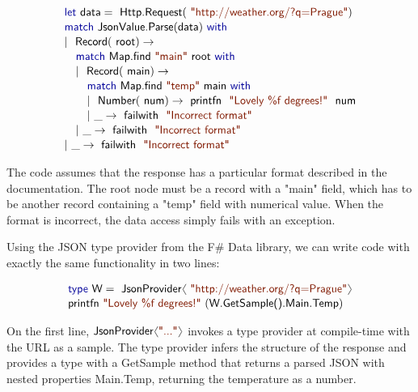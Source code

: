 \documentclass[preprint]{sigplanconf}
\newcommand{\langl}{\begin{picture}(4.5,7)
\put(1.1,2.5){\rotatebox{60}{\line(1,0){5.5}}}
\put(1.1,2.5){\rotatebox{300}{\line(1,0){5.5}}}
\end{picture}}
\newcommand{\rangl}{\begin{picture}(4.5,7)
\put(.9,2.5){\rotatebox{120}{\line(1,0){5.5}}}
\put(.9,2.5){\rotatebox{240}{\line(1,0){5.5}}}
\end{picture}}
\newcommand{\kvd}[1]{\textnormal{\textcolor{kvdclr}{\sffamily #1}}}
\newcommand{\str}[1]{\textnormal{\textcolor{strclr}{\sffamily "#1"}}}
\newcommand{\ident}[1]{\textnormal{\sffamily #1}}
\begin{document}
\noindent
\begin{equation*}
\begin{array}{l}
 \kvd{let}~\ident{data}=\ident{Http.Request}(\str{http://weather.org/?q=Prague}) \\[0.1em]
 \kvd{match}~\ident{JsonValue.Parse}(\ident{data})~\kvd{with} \\[0.1em]
 |~\ident{Record}(\ident{root})\rightarrow \\[0.1em]
 \quad \kvd{match}~\ident{Map.find}~\str{main}~\ident{root}~\kvd{with} \\[0.1em]
 \quad |~\ident{Record}(\ident{main})\rightarrow \\[0.1em]
 \quad \quad \kvd{match}~\ident{Map.find}~\str{temp}~\ident{main}~\kvd{with} \\[0.1em]
 \quad \quad |~\ident{Number}(\ident{num})\rightarrow \ident{printfn}~\str{Lovely \%f degrees!}~\ident{num} \\[0.1em]
 \quad \quad |~\_\rightarrow \ident{failwith}~\str{Incorrect format} \\[0.1em]
 \quad |~\_\rightarrow \ident{failwith}~\str{Incorrect format} \\[0.1em]
 |~\_\rightarrow \ident{failwith}~\str{Incorrect format} 
\end{array}
\end{equation*}
\vspace{0.1em}

\noindent
The code assumes that the response has a particular format described in the documentation. The
root node must be a record with a \str{main} field, which has to be another record containing
a \str{temp} field with numerical value. When the format is incorrect, the data access simply fails
with an exception.

Using the JSON type provider from the F\# Data library, we can write code with exactly the 
same functionality in two lines:

\vspace{-0.6em}
\begin{equation*}
\begin{array}{l}
 \kvd{type}~\ident{W} = \ident{JsonProvider}\langl\str{http://weather.org/?q=Prague}\rangl \\[0.1em]
 \ident{printfn}~\str{Lovely \%f degrees!}~(\ident{W.GetSample().Main.Temp})
\end{array}
\end{equation*}
\vspace{0.0em}

\noindent
On the first line, $\ident{JsonProvider}\langl\str{...}\rangl$ invokes a type provider at 
compile-time with the URL as a sample. The type provider infers the structure of the response
and provides a type with a \ident{GetSample} method that returns a parsed JSON with nested
properties \ident{Main.Temp}, returning the temperature as a number.
\end{document}
